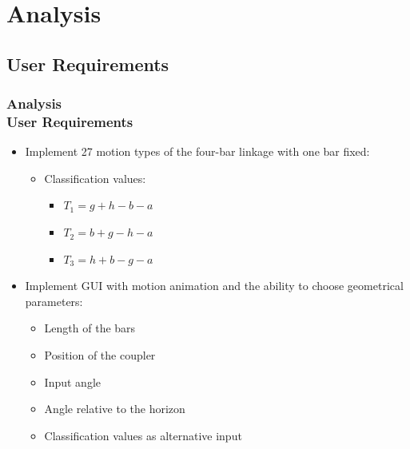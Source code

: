 \documentclass[ucs,10pt]{beamer}
\begin{document}
\section{Analysis}

\subsection{User Requirements}

\begin{frame}
\frametitle{Analysis \\
	\small \color{rwth-blue} User Requirements}
	  \begin{minipage}{\linewidth}
		\centering
		\begin{minipage}{0.6\linewidth}
			\begin{itemize}
				\item Implement 27 motion types of the four-bar linkage with one bar fixed:
				\begin{itemize}
					\item Classification values:
					\begin{itemize}
						\item $T_1 = g + h - b - a$
						\item $T_2 = b + g - h - a$
						\item $T_3 = h + b - g - a$
					\end{itemize}
				\end{itemize}
				\item Implement GUI with motion animation and the ability to choose geometrical parameters:
				\begin{itemize}
					\item Length of the bars
					\item Position of the coupler
					\item Input angle
					\item Angle relative to the horizon
					\item Classification values as alternative input
				\end{itemize}
			\end{itemize}
		\end{minipage}
		\hspace{0.05\linewidth}
		\begin{minipage}{0.31\linewidth}
			\begin{figure}[h]

\end{figure}
\end{minipage}
\end{minipage}
\end{frame}
\end{document}

